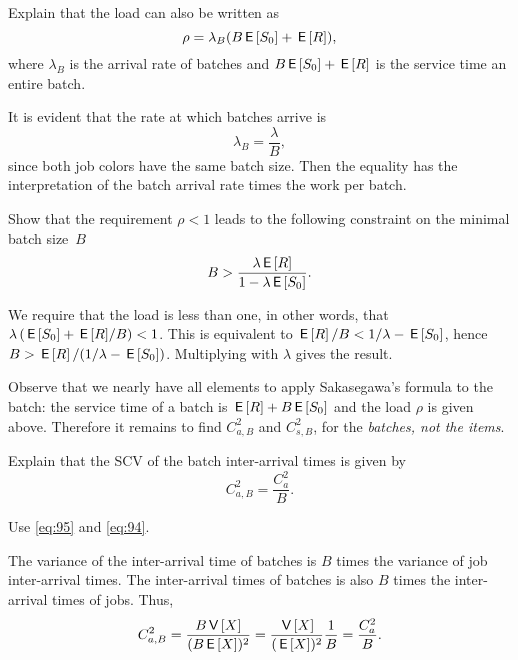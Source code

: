\begin{exercise}
Explain that the load can also be written as
\begin{equation*}
\rho = \lambda_B (B \,\mathsf{E}\left[S_0\right] + \,\mathsf{E}\left[R\right]),
\end{equation*}
where $\lambda_B$ is the arrival rate of batches and $B \,\mathsf{E}\left[S_0\right] + \,\mathsf{E}\left[R\right]$ is the service time an entire batch.
\begin{solution}
It is evident that the rate at which batches arrive is 
\begin{equation*}
 \lambda_B = \frac \lambda B,
\end{equation*}
since both job colors have the same batch size. 
Then the equality has the interpretation of the batch arrival rate times the work per batch.
\end{solution}
\end{exercise}

\begin{exercise}
Show that the requirement $\rho < 1$ leads to the following constraint on the minimal batch size~$B$ 
 \begin{equation*}
 B>\frac{\lambda \,\mathsf{E}\left[R\right]}{1-\lambda \,\mathsf{E}\left[S_0\right]}.
 \end{equation*}
\begin{solution}
 We require that the load is less than one, in other words, that $\lambda\left(\,\mathsf{E}\left[S_0\right] + {\,\mathsf{E}\left[R\right]}/B\right) < 1$. This is equivalent to $\,\mathsf{E}\left[R\right]/B < 1/\lambda - \,\mathsf{E}\left[S_0\right]$, hence $B > \,\mathsf{E}\left[R\right]/(1/\lambda - \,\mathsf{E}\left[S_0\right])$. Multiplying with $\lambda$ gives the result. 
\end{solution}
\end{exercise}

Observe that we nearly have all elements to apply Sakasegawa's formula to the batch: the service time of a batch is $\,\mathsf{E}\left[R\right] + B\,\mathsf{E}\left[S_0\right]$ and the load $\rho$ is given above.
Therefore it remains to find $C_{a,B}^2$ and $C_{s,B}^2$, for the \emph{batches, not the items}.

\begin{exercise}
Explain that the SCV of the batch inter-arrival times is given by
 \begin{equation}\label{eq:82}
C_{a,B}^2 = \frac{C_{a}^2}B.
\end{equation}
\begin{hint}
Use \cref{eq:95} and \cref{eq:94}.
\end{hint}
\begin{solution}
The variance of the inter-arrival time of batches is $B$ times the variance of job inter-arrival times. The inter-arrival times of batches is also $B$ times the inter-arrival times of jobs. Thus, 
\begin{equation*}
 C_{a,B}^2 = \frac{B \,\mathsf{V}\left[X\right]}{(B \,\mathsf{E}\left[X\right])^2} = \frac{\,\mathsf{V}\left[X\right]}{(\,\mathsf{E}\left[X\right])^2} \frac 1 B = \frac{C_a^2}{B}.
\end{equation*}
\end{solution}
\end{exercise}


